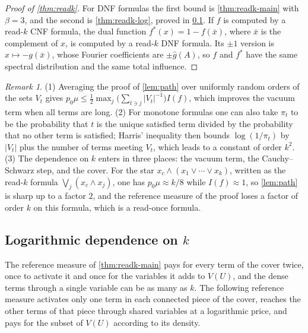 \documentclass[11pt]{amsart}
\theoremstyle{definition}
\theoremstyle{remark}
\newtheorem{remark}[theorem]{Remark}
\newcommand{\hatg}{\widehat{g}}
\begin{document}
\begin{proof}[Proof of \cref{thm:readk}]
For DNF formulas the first bound is \cref{thm:readk-main} with $\beta=3$, and the second is \cref{thm:readk-log},
proved in \cref{sec:readk-log}. If $f$ is computed by a read-$k$ CNF formula, the dual
function $f^\ast(x)=1-f(\bar x)$, where $\bar x$ is the complement of $x$, is computed by a read-$k$ DNF formula. Its
$\pm1$ version is $x\mapsto-g(\bar x)$, whose Fourier coefficients are $\pm\hatg(A)$, so $f$ and $f^\ast$ have the
same spectral distribution and the same total influence.
\end{proof}

\begin{remark}\label{rem:readk}
(1) Averaging the proof of \cref{lem:path} over uniformly random orders of the sets $V_t$ gives
$p_0\mu\le\frac12\max_j\bigl(\sum_{t\ni j}|V_t|^{-1}\bigr)I(f)$, which improves the vacuum term when all terms are
long. (2) For monotone formulas one can also take $\pi_t$ to be the probability that $t$ is the unique satisfied
term divided by the probability that no other term is satisfied; Harris' inequality then bounds $\log(1/\pi_t)$ by
$|V_t|$ plus the number of terms meeting $V_t$, which leads to a constant of order $k^2$. (3) The dependence on $k$
enters in three places: the vacuum term, the Cauchy--Schwarz step, and the cover. For the star
$x_c\wedge(x_1\vee\cdots\vee x_k)$, written as the read-$k$ formula $\bigvee_j(x_c\wedge x_j)$, one has
$p_0\mu\approx k/8$ while $I(f)\approx1$, so \cref{lem:path} is sharp up to a factor $2$, and the reference measure of
the proof loses a factor of order $k$ on this formula, which is a read-once formula.
\end{remark}

\subsection{Logarithmic dependence on $k$}\label{sec:readk-log}

The reference measure of \cref{thm:readk-main} pays for every term of the cover twice, once to activate it and once
for the variables it adds to $V(U)$, and the dense terms through a single variable can be as many as $k$. The
following reference measure activates only one term in each connected piece of the cover, reaches the other terms of
that piece through shared variables at a logarithmic price, and pays for the subset of $V(U)$ according to its
density.
\end{document}
